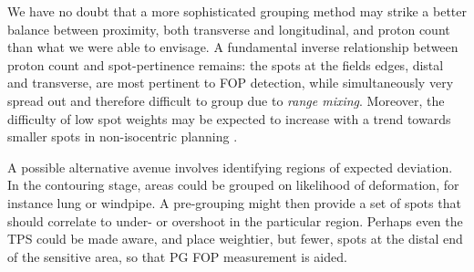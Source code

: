 \documentclass[a4paper,english]{article}
\begin{document}
We have no doubt that a more sophisticated grouping method may strike a better balance between proximity, both transverse and longitudinal, and proton count than what we were able to envisage. A fundamental inverse relationship between proton count and spot-pertinence remains: the spots at the fields edges, distal and transverse, are most pertinent to FOP detection, while simultaneously very spread out and therefore difficult to group due to \emph{range mixing}. Moreover, the difficulty of low spot weights may be expected to increase with a trend towards smaller spots in non-isocentric planning \citep{Grevillot2015}.

A possible alternative avenue involves identifying regions of expected deviation. In the contouring stage, areas could be grouped on likelihood of deformation, for instance lung or windpipe. A pre-grouping might then provide a set of spots that should correlate to under- or overshoot in the particular region. Perhaps even the TPS could be made aware, and place weightier, but fewer, spots at the distal end of the sensitive area, so that PG FOP measurement is aided.
\end{document}
